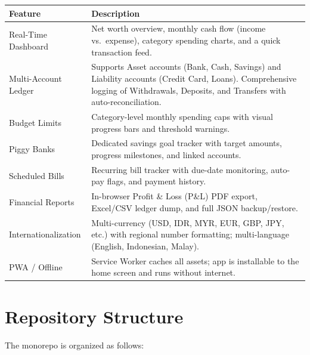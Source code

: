 \documentclass[12pt, a4paper]{article}
\begin{document}
\begin{longtable}{L{4.5cm} L{10cm}}
  \toprule
  \textbf{Feature} & \textbf{Description} \\
  \midrule
  \endhead
  Real-Time Dashboard & Net worth overview, monthly cash flow (income vs.\ expense), category spending charts, and a quick transaction feed. \\[4pt]
  Multi-Account Ledger & Supports Asset accounts (Bank, Cash, Savings) and Liability accounts (Credit Card, Loans). Comprehensive logging of Withdrawals, Deposits, and Transfers with auto-reconciliation. \\[4pt]
  Budget Limits & Category-level monthly spending caps with visual progress bars and threshold warnings. \\[4pt]
  Piggy Banks & Dedicated savings goal tracker with target amounts, progress milestones, and linked accounts. \\[4pt]
  Scheduled Bills & Recurring bill tracker with due-date monitoring, auto-pay flags, and payment history. \\[4pt]
  Financial Reports & In-browser Profit \& Loss (P\&L) PDF export, Excel/CSV ledger dump, and full JSON backup/restore. \\[4pt]
  Internationalization & Multi-currency (USD, IDR, MYR, EUR, GBP, JPY, etc.) with regional number formatting; multi-language (English, Indonesian, Malay). \\[4pt]
  PWA / Offline & Service Worker caches all assets; app is installable to the home screen and runs without internet. \\
  \bottomrule
\end{longtable}

\section{Repository Structure}

The monorepo is organized as follows:
\end{document}

